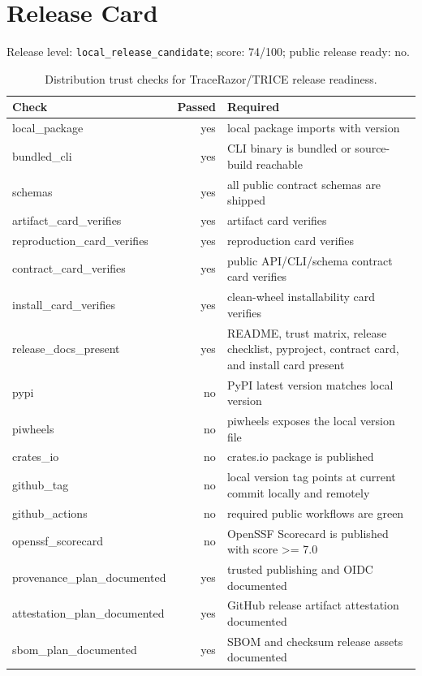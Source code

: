 \section{Release Card}
Release level: \texttt{local\_release\_candidate}; score: 74/100; public release ready: no.

\begin{table}[h]
\centering
\begin{tabular}{lrl}
\toprule
Check & Passed & Required \\
\midrule
local\_package & yes & local package imports with version \\
bundled\_cli & yes & CLI binary is bundled or source-build reachable \\
schemas & yes & all public contract schemas are shipped \\
artifact\_card\_verifies & yes & artifact card verifies \\
reproduction\_card\_verifies & yes & reproduction card verifies \\
contract\_card\_verifies & yes & public API/CLI/schema contract card verifies \\
install\_card\_verifies & yes & clean-wheel installability card verifies \\
release\_docs\_present & yes & README, trust matrix, release checklist, pyproject, contract card, and install card present \\
pypi & no & PyPI latest version matches local version \\
piwheels & no & piwheels exposes the local version file \\
crates\_io & no & crates.io package is published \\
github\_tag & no & local version tag points at current commit locally and remotely \\
github\_actions & no & required public workflows are green \\
openssf\_scorecard & no & OpenSSF Scorecard is published with score >= 7.0 \\
provenance\_plan\_documented & yes & trusted publishing and OIDC documented \\
attestation\_plan\_documented & yes & GitHub release artifact attestation documented \\
sbom\_plan\_documented & yes & SBOM and checksum release assets documented \\
\bottomrule
\end{tabular}
\caption{Distribution trust checks for TraceRazor/TRICE release readiness.}
\end{table}

